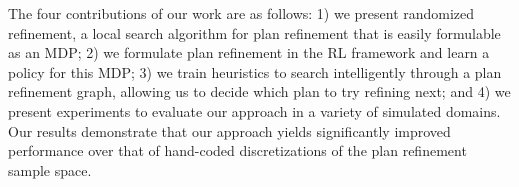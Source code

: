The four contributions of our work are as follows: 1) we present randomized refinement, a local search
algorithm for plan refinement that is easily formulable as an MDP; 2) we formulate plan refinement in the
RL framework and learn a policy for this MDP; 3) we train heuristics to search intelligently
through a plan refinement graph, allowing us to decide which plan to try refining next;
and 4) we present experiments to evaluate our approach in a variety of simulated
domains. Our results demonstrate that our approach yields significantly improved
performance over that of hand-coded discretizations of the plan refinement sample space.
